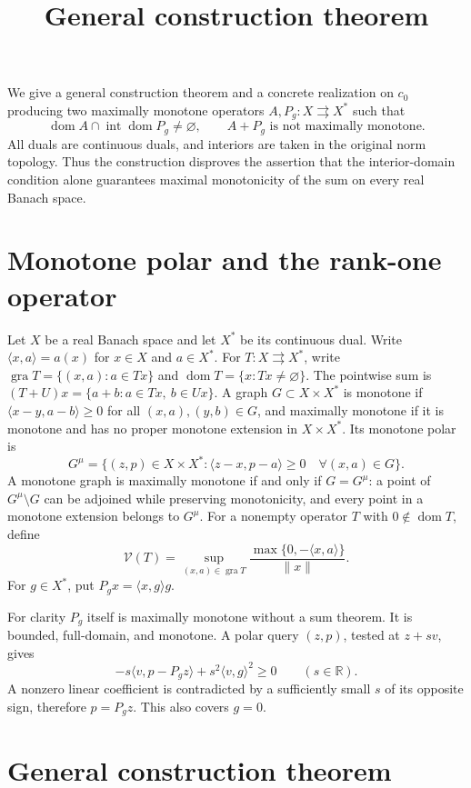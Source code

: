 \documentclass[11pt,a4paper]{article}
\title{General construction theorem}
\author{}
\date{}
\begin{document}
\maketitle

We give a general construction theorem and a concrete realization on $c_0$ producing two maximally monotone operators $A,P_g:X\rightrightarrows X^*$ such that
\[
\operatorname{dom}A\cap\operatorname{int}\operatorname{dom}P_g\ne\varnothing,
\qquad A+P_g\text{ is not maximally monotone}.
\]
All duals are continuous duals, and interiors are taken in the original norm topology. Thus the construction disproves the assertion that the interior-domain condition alone guarantees maximal monotonicity of the sum on every real Banach space.

\section{Monotone polar and the rank-one operator}

Let $X$ be a real Banach space and let $X^*$ be its continuous dual. Write $\langle x,a\rangle=a(x)$ for $x\in X$ and $a\in X^*$. For $T:X\rightrightarrows X^*$, write $\operatorname{gra}T=\{(x,a):a\in Tx\}$ and $\operatorname{dom}T=\{x:Tx\ne\varnothing\}$. The pointwise sum is $(T+U)x=\{a+b:a\in Tx,\ b\in Ux\}$. A graph $G\subset X\times X^*$ is monotone if $\langle x-y,a-b\rangle\ge0$ for all $(x,a),(y,b)\in G$, and maximally monotone if it is monotone and has no proper monotone extension in $X\times X^*$. Its monotone polar is
\[
G^\mu=\{(z,p)\in X\times X^*:
 \langle z-x,p-a\rangle\ge0\quad\forall(x,a)\in G\}.
\tag{Q0}
\]
A monotone graph is maximally monotone if and only if $G=G^\mu$: a point of $G^\mu\setminus G$ can be adjoined while preserving monotonicity, and every point in a monotone extension belongs to $G^\mu$.
For a nonempty operator $T$ with $0\notin\operatorname{dom}T$, define
\[
\mathcal V(T)=\sup_{(x,a)\in\operatorname{gra}T}
\frac{\max\{0,-\langle x,a\rangle\}}{\|x\|}.
\]
For $g\in X^*$, put $P_gx=\langle x,g\rangle g$.

For clarity $P_g$ itself is maximally monotone without a sum theorem. It is bounded, full-domain, and monotone. A polar query $(z,p)$, tested at $z+sv$, gives
\[
-s\langle v,p-P_gz\rangle+s^2\langle v,g\rangle^2\ge0
\qquad(s\in\mathbb R).
\]
A nonzero linear coefficient is contradicted by a sufficiently small $s$ of its opposite sign, therefore $p=P_gz$. This also covers $g=0$.

\section{General construction theorem}
\end{document}
